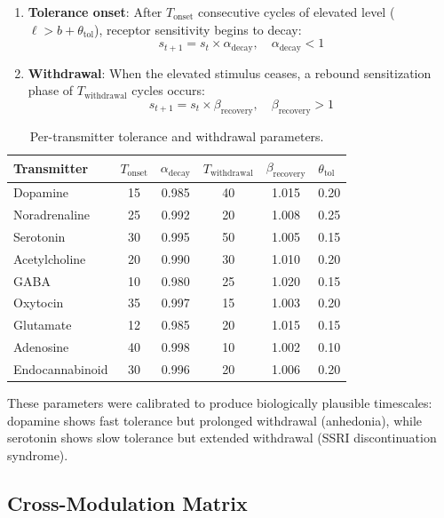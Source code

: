 \documentclass[11pt,a4paper]{article}
\begin{document}
\begin{enumerate}
  \item \textbf{Tolerance onset}: After $T_{\text{onset}}$ consecutive cycles of elevated level ($\ell > b + \theta_{\text{tol}}$), receptor sensitivity begins to decay:
  \begin{equation}
    s_{t+1} = s_t \times \alpha_{\text{decay}}, \quad \alpha_{\text{decay}} < 1
  \end{equation}
  \item \textbf{Withdrawal}: When the elevated stimulus ceases, a rebound sensitization phase of $T_{\text{withdrawal}}$ cycles occurs:
  \begin{equation}
    s_{t+1} = s_t \times \beta_{\text{recovery}}, \quad \beta_{\text{recovery}} > 1
  \end{equation}
\end{enumerate}

\begin{table}[h]
\centering
\caption{Per-transmitter tolerance and withdrawal parameters.}
\label{tab:tolerance}
\begin{tabular}{lccccl}
\toprule
\textbf{Transmitter} & $T_{\text{onset}}$ & $\alpha_{\text{decay}}$ & $T_{\text{withdrawal}}$ & $\beta_{\text{recovery}}$ & $\theta_{\text{tol}}$ \\
\midrule
Dopamine & 15 & 0.985 & 40 & 1.015 & 0.20 \\
Noradrenaline & 25 & 0.992 & 20 & 1.008 & 0.25 \\
Serotonin & 30 & 0.995 & 50 & 1.005 & 0.15 \\
Acetylcholine & 20 & 0.990 & 30 & 1.010 & 0.20 \\
GABA & 10 & 0.980 & 25 & 1.020 & 0.15 \\
Oxytocin & 35 & 0.997 & 15 & 1.003 & 0.20 \\
Glutamate & 12 & 0.985 & 20 & 1.015 & 0.15 \\
Adenosine & 40 & 0.998 & 10 & 1.002 & 0.10 \\
Endocannabinoid & 30 & 0.996 & 20 & 1.006 & 0.20 \\
\bottomrule
\end{tabular}
\end{table}

These parameters were calibrated to produce biologically plausible timescales: dopamine shows fast tolerance but prolonged withdrawal (anhedonia), while serotonin shows slow tolerance but extended withdrawal (SSRI discontinuation syndrome).

\subsection{Cross-Modulation Matrix}
\end{document}
